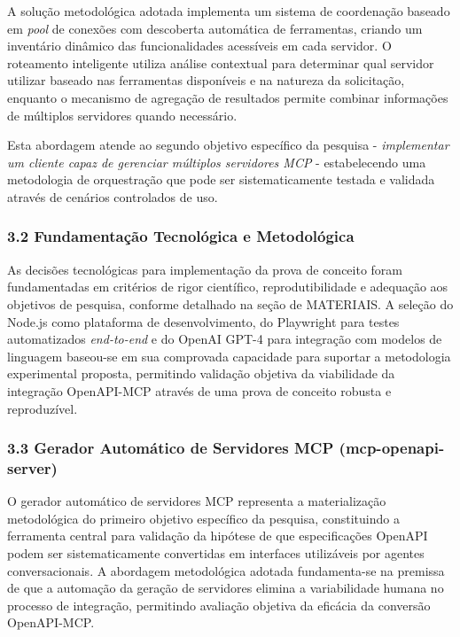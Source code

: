 \documentclass[
]{article}
\begin{document}
A solução metodológica adotada implementa um sistema de coordenação
baseado em \emph{pool} de conexões com descoberta automática de
ferramentas, criando um inventário dinâmico das funcionalidades
acessíveis em cada servidor. O roteamento inteligente utiliza análise
contextual para determinar qual servidor utilizar baseado nas
ferramentas disponíveis e na natureza da solicitação, enquanto o
mecanismo de agregação de resultados permite combinar informações de
múltiplos servidores quando necessário.

Esta abordagem atende ao segundo objetivo específico da pesquisa -
\emph{implementar um cliente capaz de gerenciar múltiplos servidores
MCP} - estabelecendo uma metodologia de orquestração que pode ser
sistematicamente testada e validada através de cenários controlados de
uso.

\subsubsection{3.2 Fundamentação Tecnológica e
Metodológica}\label{fundamentauxe7uxe3o-tecnoluxf3gica-e-metodoluxf3gica}

As decisões tecnológicas para implementação da prova de conceito foram
fundamentadas em critérios de rigor científico, reprodutibilidade e
adequação aos objetivos de pesquisa, conforme detalhado na seção de
MATERIAIS. A seleção do Node.js como plataforma de desenvolvimento, do
Playwright para testes automatizados \emph{end-to-end} e do OpenAI GPT-4
para integração com modelos de linguagem baseou-se em sua comprovada
capacidade para suportar a metodologia experimental proposta, permitindo
validação objetiva da viabilidade da integração OpenAPI-MCP através de
uma prova de conceito robusta e reproduzível.

\subsubsection{3.3 Gerador Automático de Servidores MCP
(mcp-openapi-server)}\label{gerador-automuxe1tico-de-servidores-mcp-mcp-openapi-server}

O gerador automático de servidores MCP representa a materialização
metodológica do primeiro objetivo específico da pesquisa, constituindo a
ferramenta central para validação da hipótese de que especificações
OpenAPI podem ser sistematicamente convertidas em interfaces utilizáveis
por agentes conversacionais. A abordagem metodológica adotada
fundamenta-se na premissa de que a automação da geração de servidores
elimina a variabilidade humana no processo de integração, permitindo
avaliação objetiva da eficácia da conversão OpenAPI-MCP.
\end{document}
